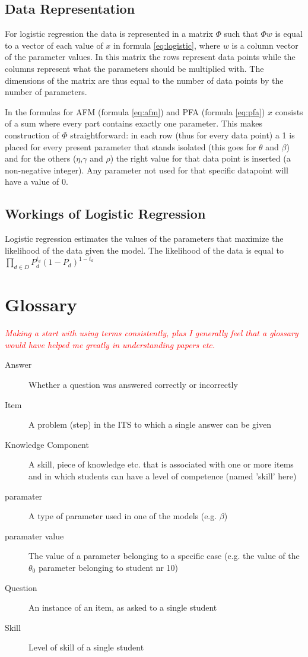 \documentclass{scrartcl}
\newcommand\todo[1]{\textit{\textcolor{red}{#1}}}
\begin{document}
\subsection{Data Representation}
For logistic regression the data is represented in a matrix $\Phi$ such that $\Phi w$ is equal to a vector of each value of $x$ in formula \ref{eq:logistic}, where $w$ is a column vector of the parameter values. 
In this matrix the rows represent data points while the columns represent what the parameters should be multiplied with. The dimensions of the matrix are thus equal to the number of data points by the number of parameters.

In the formulas for AFM (formula \ref{eq:afm}) and PFA (formula \ref{eq:pfa}) $x$ consists of a sum where every part contains exactly one parameter. This makes construction of $\Phi$ straightforward: in each row (thus for every data point) a 1 is placed for every present parameter that stands isolated (this goes for $\theta$ and $\beta$) and for the others ($\eta$,$\gamma$ and $\rho$) the right value for that data point is inserted (a non-negative integer). Any parameter not used for that specific datapoint will have a value of 0.

\subsection{Workings of Logistic Regression}
Logistic regression estimates the values of the parameters that maximize the likelihood of the data given the model. The likelihood of the data is equal to $\prod_{d \in D} P_{d}^{t_d}  (1- P_{d})^{1-t_d} $

\pagebreak 
\section{Glossary}
\todo{
Making a start with using terms consistently, plus I generally feel that a glossary would have helped me greatly in understanding papers etc.}
\begin{description}
\item[Answer]Whether a question was answered correctly or incorrectly
  \item[Item] A problem (step) in the ITS to which a single answer can be given
  \item[Knowledge Component] A skill, piece of knowledge etc. that is associated with one or more items and in which students can have a level of competence (named 'skill' here)
  \item[paramater] A type of parameter used in one of the models (e.g. $\beta$)
  \item[paramater value] The value of a parameter belonging to a specific case (e.g. the value of the $\theta_{0}$ parameter belonging to student nr 10)
  \item[Question] An instance of an item, as asked to a single student
  \item[Skill] Level of skill of a single student
\end{description}
\end{document}
